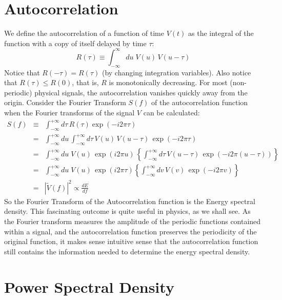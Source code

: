 \documentclass[12pt,oneside]{book}
\begin{document}
\section{Autocorrelation}

We define the autocorrelation of a function of time $V(t)$ as the integral of the function with a copy of itself delayed by time $\tau$:
\begin{equation}
R(\tau) \equiv \int^{\infty}_{-\infty} du \; V(u) \, V(u-\tau) \label{eqn:auto}
\end{equation}
Notice that $R(-\tau) = R(\tau)$ (by changing integration variables).  Also notice that $R(\tau) \leq R(0)$, that is, $R$ is monotonically decreasing.  For most (non-periodic) physical signals, the autocorrelation vanishes quickly away from the origin.  Consider the Fourier Transform $S(f)$ of the autocorrelation function when the Fourier transforms of the signal $V$ can be calculated:
\begin{eqnarray*}
S(f) &\equiv&  \int_{-\infty}^{+\infty} d\tau \, R(\tau) \exp(-i2\pi \tau) \\
&=& \int_{-\infty}^{+\infty} du \, \int_{-\infty}^{+\infty} d\tau \, V(u) \, V(u-\tau) \, \exp(-i2\pi \tau) \\
&=& \int_{-\infty}^{+\infty} du \; V(u) \, \exp(i2\pi u) \, \left\{ \int_{-\infty}^{+\infty} d\tau \, V(u-\tau) \, \exp(-i2\pi(u-\tau)) \right\}\\
&=& \int_{-\infty}^{+\infty} du \; V(u) \, \exp(i2\pi \tau) \left\{ \int_{-\infty}^{+\infty} dv \, V(v) \, \exp(-i2\pi v) \right\}\\
&=& | \widetilde{V}(f) |^2 \propto \frac{dE}{df}
\end{eqnarray*}
So the Fourier Transform of the Autocorrelation function is the Energy spectral density.  This fascinating outcome is quite useful in physics, as we shall see.  As the Fourier transform measures the amplitude of the periodic functions contained within a signal, and the autocorrelation function preserves the periodicity of the original function, it makes sense intuitive sense that the autocorrelation function still contains the information needed to determine the energy spectral density.

\section{Power Spectral Density}
\end{document}
